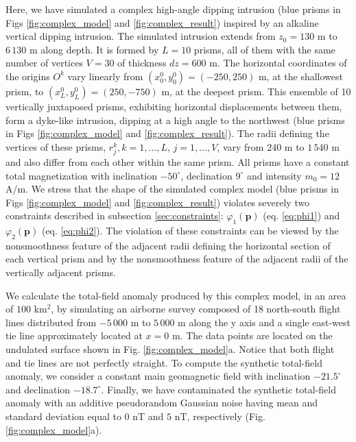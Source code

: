Here, we have simulated a complex high-angle dipping intrusion (blue prisms in Figs \ref{fig:complex_model} and \ref{fig:complex_result}) inspired by an alkaline vertical dipping intrusion. 
The simulated intrusion extends from $z_0=130$ m to $6\,130$ m along depth.
It is formed by $ L = 10 $ prisms, all of them with the same number of vertices $ V = 30 $ of thickness $ dz = 600 $ m. 
The horizontal coordinates of the origins $ O^k $ vary linearly from $ (x_0^0, y_0^0) = (-250, 250) $ m, at the shallowest prism, to $ (x_L^0, y_L^0) = (250, -750) $ m, at the deepest prism. 
This ensemble of 10 vertically juxtaposed prisms, exhibiting horizontal displacements between them, form a dyke-like intrusion, dipping at a high angle to the northwest (blue prisms in Figs \ref{fig:complex_model} and \ref{fig:complex_result}). 
The radii defining the vertices of these prisms, $ r^k_j, k = 1, \dots, L$, $j = 1,\dots, V$, 
vary from $ 240 $ m to $ 1\,540 $ m and also differ from each other within the same prism. 
All prisms have a constant total magnetization with inclination $ -50^\circ $, declination $ 9^\circ $ and intensity $ m_0 = 12 $ A/m. 
We stress that the shape of the simulated complex model (blue prisms in Figs \ref{fig:complex_model} and \ref{fig:complex_result}) violates severely two constraints described in subsection \ref{sec:constraints}: $\varphi_{1}(\mathbf{p})$ (eq. \ref{eq:phi1})
and $\varphi_{2}(\mathbf{p})$ (eq. \ref{eq:phi2}).
The violation of these constraints can be viewed by the nonsmoothness feature of the adjacent radii defining the horizontal section of each vertical prism and by the nonsmoothness feature of the adjacent radii of the vertically adjacent prisms.

We calculate the total-field anomaly produced by this complex model, in an area of $ 100 $ km$^2 $, by simulating an airborne survey composed of 18 north-south flight lines distributed from $ -5\,000 $ m to $ 5\,000 $ m along the y axis and a single east-west tie line approximately located at $ x = 0 $ m. 
The data points are located on the undulated surface shown in Fig. \ref{fig:complex_model}a. Notice that both flight and tie lines are not perfectly straight. 
To compute the synthetic total-field anomaly, we consider a constant main geomagnetic field with inclination $ -21.5^\circ $ and declination $ -18.7^\circ $. 
Finally, we have contaminated the synthetic total-field anomaly with an additive pseudorandom Gaussian noise having mean and standard deviation equal to $0$ nT and $5$ nT, respectively (Fig. \ref{fig:complex_model}a).

